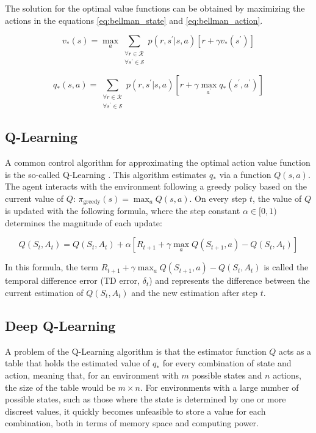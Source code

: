 The solution for the optimal value functions can be obtained by maximizing the actions in the equations \ref{eq:bellman_state} and \ref{eq:bellman_action}.

\begin{equation}
    v_\ast(s) = \max_{a} \sum_{\substack{\forall r \in \mathcal{R} \\ \forall s^\prime \in \mathcal{S}}}{p(r,s^\prime|s,a)[r + \gamma v_\ast(s^\prime)]}
\end{equation}

\begin{equation}
    q_\ast(s,a) = \sum_{\substack{\forall r \in \mathcal{R} \\ \forall s^\prime \in \mathcal{S}}}{p(r,s^\prime|s,a)[r + \gamma \max_{a^\prime} q_\ast(s^\prime,a^\prime)]}
\end{equation}

\subsection{Q-Learning}

A common control algorithm for approximating the optimal action value function is the so-called Q-Learning \cite{Watkins:1992}. This algorithm estimates $q_\ast$ via a function $Q(s,a)$. The agent interacts with the environment following a greedy policy based on the current value of $Q$: $\pi_\textrm{greedy}(s) = \max_a Q(s,a)$. On every step $t$, the value of $Q$ is updated with the following formula, where the step constant $\alpha \in [0,1)$ determines the magnitude of each update:

\begin{equation}
    Q(S_t,A_t) = Q(S_t,A_t) + \alpha[R_{t+1} + \gamma \max_a Q(S_{t+1},a) - Q(S_t,A_t)]
\end{equation}

In this formula, the term $R_{t+1} + \gamma \max_a Q(S_{t+1},a) - Q(S_t,A_t)$ is called the temporal difference error (TD error, $\delta_t$) and represents the difference between the current estimation of $Q(S_t,A_t)$ and the new estimation after step $t$.

\subsection{Deep Q-Learning}

A problem of the Q-Learning algorithm is that the estimator function $Q$ acts as a table that holds the estimated value of $q_\ast$ for every combination of state and action, meaning that, for an environment with $m$ possible states and $n$ actions, the size of the table would be $m \times n$. For environments with a large number of possible states, such as those where the state is determined by one or more discreet values, it quickly becomes unfeasible to store a value for each combination, both in terms of memory space and computing power.

